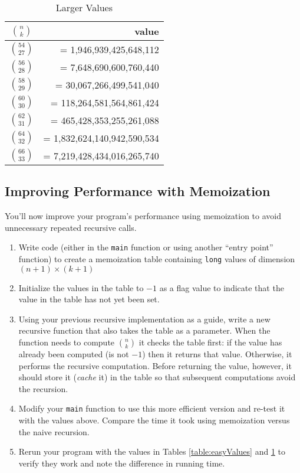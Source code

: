 \documentclass[12pt]{scrartcl}
\begin{document}
\begin{table}[ht]
\centering
\begin{tabular}{c|r}
${n \choose k}$ &  value \\
\hline\hline
${54 \choose 27}$ & =     1,946,939,425,648,112 \\
${56 \choose 28}$ & =     7,648,690,600,760,440 \\
${58 \choose 29}$ & =    30,067,266,499,541,040 \\
${60 \choose 30}$ & =   118,264,581,564,861,424 \\
${62 \choose 31}$ & =   465,428,353,255,261,088 \\
${64 \choose 32}$ & = 1,832,624,140,942,590,534 \\
${66 \choose 33}$ & = 7,219,428,434,016,265,740 \\
\end{tabular}
\caption{Larger Values}
\label{table:hardValues}
\end{table}

\subsection*{Improving Performance with Memoization}

You'll now improve your program's performance using memoization
to avoid unnecessary repeated recursive calls.  

\begin{enumerate}
  \item Write code (either in the \texttt{main} function or 
  using another ``entry point'' function) to create a memoization table 
  containing \texttt{long} values of dimension $(n+1) \times (k+1)$
  \item Initialize the values in the table to $-1$ as a flag value
  to indicate that the value in the table has not yet been set.
  \item Using your previous recursive implementation as a guide, write
  a new recursive function that also takes the table as a parameter.
  When the function needs to compute ${n \choose k}$ it checks the table
  first: if the value has already been computed (is not $-1$) then it
  returns that value.  Otherwise, it performs the recursive computation.
  Before returning the value, however, it should store it (\emph{cache}
  it) in the table so that subsequent computations avoid the recursion.  
  \item Modify your \texttt{main} function to use this more
  efficient version and re-test it with the values above.  Compare the
  time it took using memoization versus the naive recursion.
  \item Rerun your program with the values in Tables \ref{table:easyValues} 
  and \ref{table:hardValues} to verify they work and note the difference
  in running time.  
\end{enumerate}
\end{document}
